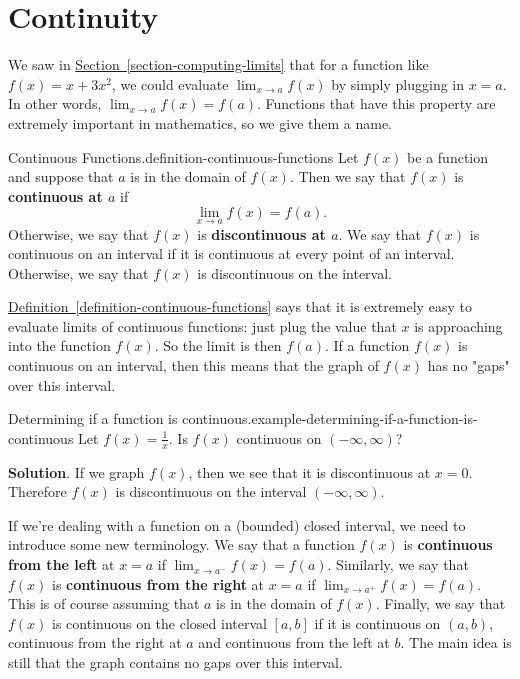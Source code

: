 \documentclass[10pt,]{book}
\newcommand{\terminology}[1]{\textbf{#1}}
\numberwithin{equation}{section}
\begin{document}
\section[{Continuity}]{Continuity}\label{section-continuity}
\hypertarget{p-31}{}%
We saw in \hyperref[section-computing-limits]{Section~\ref{section-computing-limits}} that for a function like \(f(x) = x+3x^{2}\), we could evaluate \(\lim_{x\to a}f(x)\) by simply plugging in \(x=a\). In other words, \(\lim_{x\to a}f(x) = f(a)\). Functions that have this property are extremely important in mathematics, so we give them a name.%
\begin{definition}{Continuous Functions.}{definition-continuous-functions}%
\hypertarget{p-32}{}%
Let \(f(x)\) be a function and suppose that \(a\) is in the domain of \(f(x)\). Then we say that \(f(x)\) is \terminology{continuous at \(a\)} if%
\begin{equation*}
\lim_{x\to a}f(x) = f(a)\text{.}
\end{equation*}
Otherwise, we say that \(f(x)\) is \terminology{discontinuous at \(a\)}. We say that \(f(x)\) is continuous on an interval if it is continuous at every point of an interval. Otherwise, we say that \(f(x)\) is discontinuous on the interval.%
\end{definition}
\hypertarget{p-33}{}%
\hyperref[definition-continuous-functions]{Definition~\ref{definition-continuous-functions}} says that it is extremely easy to evaluate limits of continuous functions: just plug the value that \(x\) is approaching into the function \(f(x)\). So the limit is then \(f(a)\). If a function \(f(x)\) is continuous on an interval, then this means that the graph of \(f(x)\) has no "gaps" over this interval.%
\begin{example}{Determining if a function is continuous.}{example-determining-if-a-function-is-continuous}%
\hypertarget{p-34}{}%
Let \(f(x) = \frac{1}{x}\). Is \(f(x)\) continuous on \((-\infty,\infty)\)?%
\par\smallskip%
\noindent\textbf{Solution}.\hypertarget{solution-6}{}\quad%
\hypertarget{p-35}{}%
If we graph \(f(x)\), then we see that it is discontinuous at \(x=0\). Therefore \(f(x)\) is discontinuous on the interval \((-\infty,\infty)\).%
\end{example}
\hypertarget{p-36}{}%
If we're dealing with a function on a (bounded) closed interval, we need to introduce some new terminology. We say that a function \(f(x)\) is \terminology{continuous from the left} at \(x=a\) if \(\lim_{x\to a^{-}}f(x) = f(a)\). Similarly, we say that \(f(x)\) is \terminology{continuous from the right} at \(x=a\) if \(\lim_{x\to a^{+}}f(x) = f(a)\). This is of course assuming that \(a\) is in the domain of \(f(x)\). Finally, we say that \(f(x)\) is continuous on the closed interval \([a,b]\) if it is continuous on \((a,b)\), continuous from the right at \(a\) and continuous from the left at \(b\). The main idea is still that the graph contains no gaps over this interval.%
\end{document}
